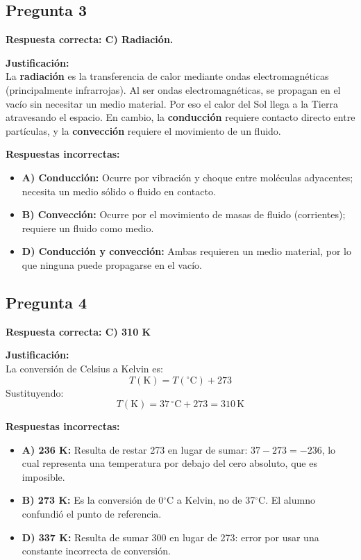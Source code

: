 \begin{respuestabox}
\subsection*{Pregunta 3}
\textcolor{verdecorrecto}{\textbf{Respuesta correcta: C) Radiación.}}

\textbf{Justificación:}\\
La \textbf{radiación} es la transferencia de calor mediante ondas electromagnéticas (principalmente infrarrojas). Al ser ondas electromagnéticas, se propagan en el vacío sin necesitar un medio material. Por eso el calor del Sol llega a la Tierra atravesando el espacio. En cambio, la \textbf{conducción} requiere contacto directo entre partículas, y la \textbf{convección} requiere el movimiento de un fluido.

\textbf{Respuestas incorrectas:}
\begin{itemize}
    \item \textbf{A) Conducción:} Ocurre por vibración y choque entre moléculas adyacentes; necesita un medio sólido o fluido en contacto.
    \item \textbf{B) Convección:} Ocurre por el movimiento de masas de fluido (corrientes); requiere un fluido como medio.
    \item \textbf{D) Conducción y convección:} Ambas requieren un medio material, por lo que ninguna puede propagarse en el vacío.
\end{itemize}
\end{respuestabox}

\begin{respuestabox}
\subsection*{Pregunta 4}
\textcolor{verdecorrecto}{\textbf{Respuesta correcta: C) 310 K}}

\textbf{Justificación:}\\
La conversión de Celsius a Kelvin es:
$$T(\text{K}) = T(^\circ\text{C}) + 273$$
Sustituyendo:
$$T(\text{K}) = 37\,^\circ\text{C} + 273 = 310\,\text{K}$$

\textbf{Respuestas incorrectas:}
\begin{itemize}
    \item \textbf{A) 236 K:} Resulta de restar 273 en lugar de sumar: $37 - 273 = -236$, lo cual representa una temperatura por debajo del cero absoluto, que es imposible.
    \item \textbf{B) 273 K:} Es la conversión de 0$^\circ$C a Kelvin, no de 37$^\circ$C. El alumno confundió el punto de referencia.
    \item \textbf{D) 337 K:} Resulta de sumar 300 en lugar de 273: error por usar una constante incorrecta de conversión.
\end{itemize}
\end{respuestabox}

